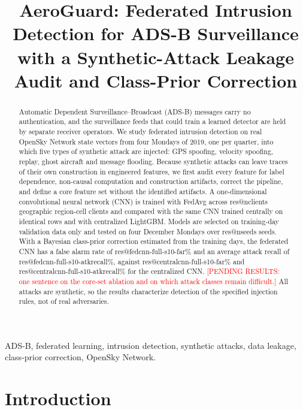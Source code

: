 \documentclass[conference]{IEEEtran}
\title{AeroGuard: Federated Intrusion Detection for ADS-B Surveillance with a Synthetic-Attack Leakage Audit and Class-Prior Correction}
\author{\IEEEauthorblockN{Author Name(s)}\IEEEauthorblockA{Affiliation(s)\\Email(s)}}
\makeatletter
\providecommand{\R}[1]{\csname res@#1\endcsname}
\newcommand{\pending}[1]{\textcolor{red}{[PENDING RESULTS: #1]}}
\makeatother
\begin{document}
\maketitle

\begin{abstract}
Automatic Dependent Surveillance--Broadcast (ADS-B) messages carry no authentication, and the surveillance feeds that could train a learned detector are held by separate receiver operators. We study federated intrusion detection on real OpenSky Network state vectors from four Mondays of 2019, one per quarter, into which five types of synthetic attack are injected: GPS spoofing, velocity spoofing, replay, ghost aircraft and message flooding. Because synthetic attacks can leave traces of their own construction in engineered features, we first audit every feature for label dependence, non-causal computation and construction artifacts, correct the pipeline, and define a core feature set without the identified artifacts. A one-dimensional convolutional neural network (CNN) is trained with FedAvg across \R{nclients} geographic region-cell clients and compared with the same CNN trained centrally on identical rows and with centralized LightGBM. Models are selected on training-day validation data only and tested on four December Mondays over \R{nseeds} seeds. With a Bayesian class-prior correction estimated from the training days, the federated CNN has a false alarm rate of \R{fedcnn-full-s10-far}\% and an average attack recall of \R{fedcnn-full-s10-atkrecall}\%, against \R{centralcnn-full-s10-far}\% and \R{centralcnn-full-s10-atkrecall}\% for the centralized CNN. \pending{one sentence on the core-set ablation and on which attack classes remain difficult.} All attacks are synthetic, so the results characterize detection of the specified injection rules, not of real adversaries.
\end{abstract}

\begin{IEEEkeywords}ADS-B, federated learning, intrusion detection, synthetic attacks, data leakage, class-prior correction, OpenSky Network.\end{IEEEkeywords}

\section{Introduction}
\end{document}
